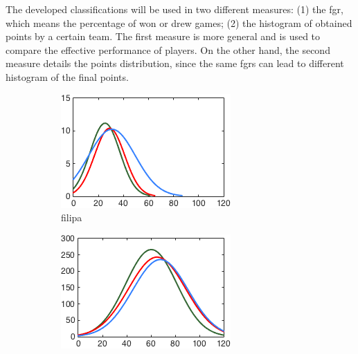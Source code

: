 The developed classifications will be used in two different measures: (1) the \ac{fgr}, which means the percentage of won or drew games; (2) the histogram of obtained points by a certain team.
The first measure is more general and is used to compare the effective performance of players.
On the other hand, the second measure details the points distribution, since the same \acp{fgr} can lead to different histogram of the final points.

\begin{figure}[h]
        \centering
        \begin{subfigure}[h]{0.32\textwidth}
                \includegraphics[width=\textwidth]{./img/5/ABChard}
                \caption{filipa}
                \label{fig:ABC-Hhard}
        \end{subfigure}
        \begin{subfigure}[h]{0.32\textwidth}
                \includegraphics[width=\textwidth]{./img/5/ABCmedium}

\end{subfigure}
\end{figure}
